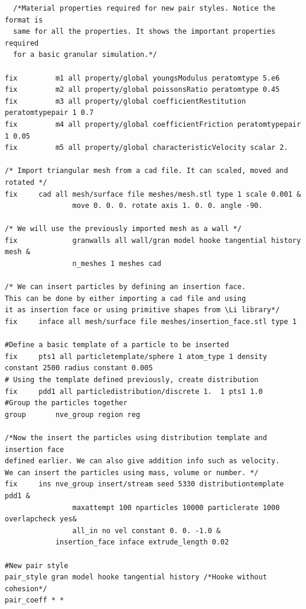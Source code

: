 \documentclass{tufte-book} %
\newcommand{\Li}{\textit{LIGGGHTS}}
\begin{document}
\begin{verbatim}
  /*Material properties required for new pair styles. Notice the format is
  same for all the properties. It shows the important properties required
  for a basic granular simulation.*/

fix 		m1 all property/global youngsModulus peratomtype 5.e6
fix 		m2 all property/global poissonsRatio peratomtype 0.45
fix 		m3 all property/global coefficientRestitution peratomtypepair 1 0.7
fix 		m4 all property/global coefficientFriction peratomtypepair 1 0.05
fix 		m5 all property/global characteristicVelocity scalar 2.

/* Import triangular mesh from a cad file. It can scaled, moved and rotated */
fix		cad all mesh/surface file meshes/mesh.stl type 1 scale 0.001 &
                move 0. 0. 0. rotate axis 1. 0. 0. angle -90.

/* We will use the previously imported mesh as a wall */
fix             granwalls all wall/gran model hooke tangential history mesh &
                n_meshes 1 meshes cad

/* We can insert particles by defining an insertion face.
This can be done by either importing a cad file and using
it as insertion face or using primitive shapes from \Li library*/
fix		inface all mesh/surface file meshes/insertion_face.stl type 1

#Define a basic template of a particle to be inserted
fix		pts1 all particletemplate/sphere 1 atom_type 1 density constant 2500 radius constant 0.005
# Using the template defined previously, create distribution
fix		pdd1 all particledistribution/discrete 1.  1 pts1 1.0
#Group the particles together
group		nve_group region reg

/*Now the insert the particles using distribution template and insertion face
defined earlier. We can also give addition info such as velocity.
We can insert the particles using mass, volume or number. */
fix		ins nve_group insert/stream seed 5330 distributiontemplate pdd1 &
                maxattempt 100 nparticles 10000 particlerate 1000 overlapcheck yes&
                all_in no vel constant 0. 0. -1.0 &
	        insertion_face inface extrude_length 0.02

#New pair style
pair_style gran model hooke tangential history /*Hooke without cohesion*/
pair_coeff * *
\end{verbatim}
\end{document}
